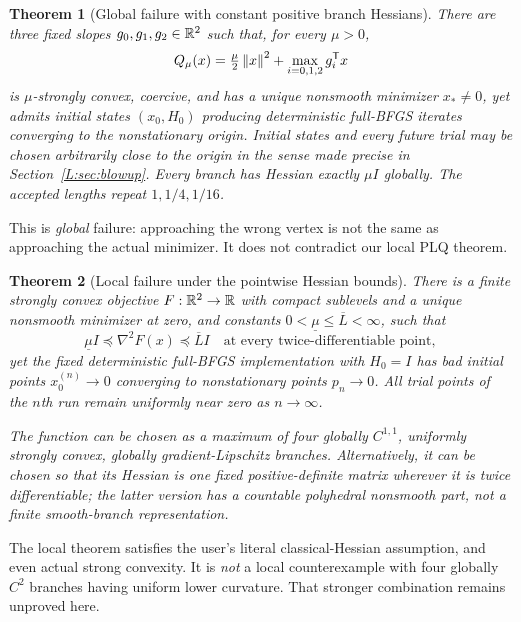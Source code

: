 \documentclass[10pt,oneside,openany]{book}
\newtheorem{theorem}{Theorem}[chapter]
\theoremstyle{remark}\newtheorem{remark}{Remark}[chapter]
\begin{document}
\begin{theorem}[Global failure with constant positive branch Hessians]\label{L:thm:global}
There are three fixed slopes $g_0,g_1,g_2\in\mathbb R^2$ such that, for every $\mu>0$,
\[
 Q_\mu(x)=\tfrac\mu2\left\lVert x\right\rVert^2+\max_{i=0,1,2}g_i^{\mathsf T} x
\]
is $\mu$-strongly convex, coercive, and has a unique nonsmooth minimizer $x_*\ne0$, yet admits initial states $(x_0,H_0)$ producing deterministic full-BFGS iterates converging to the nonstationary origin. Initial states and every future trial may be chosen arbitrarily close to the origin in the sense made precise in Section~\ref{L:sec:blowup}. Every branch has Hessian exactly $\mu I$ globally. The accepted lengths repeat $1,1/4,1/16$.
\end{theorem}
\noindent This is \emph{global} failure: approaching the wrong vertex is not the same as approaching the actual minimizer. It does not contradict our local PLQ theorem.

\begin{theorem}[Local failure under the pointwise Hessian bounds]\label{L:thm:local}
There is a finite strongly convex objective $F:\mathbb R^2\to\mathbb R$ with compact sublevels and a unique nonsmooth minimizer at zero, and constants $0<\underline\mu\le\overline L<\infty$, such that
\[
 \underline\mu I\preceq \nabla^2F(x)\preceq\overline L I
 \quad\text{at every twice-differentiable point},
\]
yet the fixed deterministic full-BFGS implementation with $H_0=I$ has bad initial points $x_0^{(n)}\to0$ converging to nonstationary points $p_n\to0$. All trial points of the $n$th run remain uniformly near zero as $n\to\infty$.

The function can be chosen as a maximum of four globally $C^{1,1}$, uniformly strongly convex, globally gradient-Lipschitz branches. Alternatively, it can be chosen so that its Hessian is one fixed positive-definite matrix wherever it is twice differentiable; the latter version has a countable polyhedral nonsmooth part, not a finite smooth-branch representation.
\end{theorem}
\noindent The local theorem satisfies the user's literal classical-Hessian assumption, and even actual strong convexity. It is \emph{not} a local counterexample with four globally $C^2$ branches having uniform lower curvature. That stronger combination remains unproved here.


\setcounter{section}{1}
\setcounter{theorem}{2}
\setcounter{lemma}{0}
\setcounter{corollary}{0}
\setcounter{proposition}{0}
\setcounter{remark}{0}
\setcounter{equation}{0}
\end{document}
